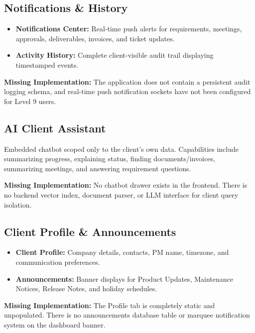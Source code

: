 \documentclass[11pt,a4paper]{article}
\begin{document}
\subsection{Notifications \& History}
\begin{itemize}
    \item \textbf{Notifications Center:} Real-time push alerts for requirements, meetings, approvals, deliverables, invoices, and ticket updates.
    \item \textbf{Activity History:} Complete client-visible audit trail displaying timestamped events.
\end{itemize}
\begin{missingstatus}
  \textbf{Missing Implementation:} The application does not contain a persistent audit logging schema, and real-time push notification sockets have not been configured for Level 9 users.
\end{missingstatus}

\subsection{AI Client Assistant}
Embedded chatbot scoped only to the client's own data. Capabilities include summarizing progress, explaining status, finding documents/invoices, summarizing meetings, and answering requirement questions.
\begin{missingstatus}
  \textbf{Missing Implementation:} No chatbot drawer exists in the frontend. There is no backend vector index, document parser, or LLM interface for client query isolation.
\end{missingstatus}

\subsection{Client Profile \& Announcements}
\begin{itemize}
    \item \textbf{Client Profile:} Company details, contacts, PM name, timezone, and communication preferences.
    \item \textbf{Announcements:} Banner displays for Product Updates, Maintenance Notices, Release Notes, and holiday schedules.
\end{itemize}
\begin{missingstatus}
  \textbf{Missing Implementation:} The Profile tab is completely static and unpopulated. There is no announcements database table or marquee notification system on the dashboard banner.
\end{missingstatus}
\end{document}
